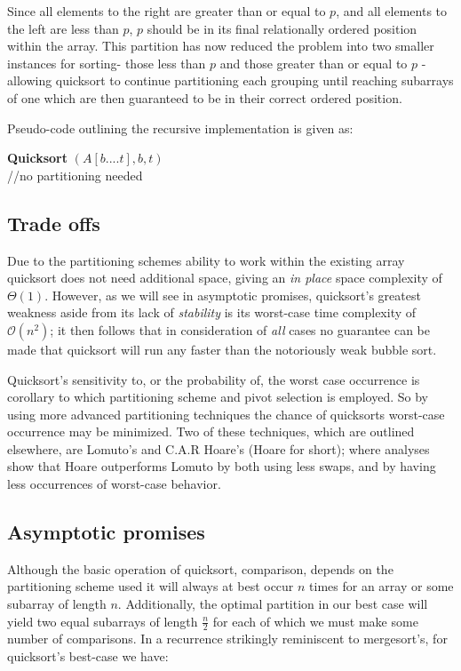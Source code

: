\documentclass[11pt,letterpaper]{report}
\begin{document}
Since all elements to the right are greater than or equal to $p$, and all elements to the left are less than $p$, $p$ should be in its final relationally ordered position within the array. This partition has now reduced the problem into two smaller instances for sorting- those less than $p$ and those greater than or equal to $p$ - allowing quicksort to continue partitioning each grouping until reaching subarrays of one which are then guaranteed to be in their correct ordered position.

Pseudo-code outlining the recursive implementation is given as:\\


\begin{algorithm}[H]
\textbf{Quicksort} $(A[b....t], b, t)$ \\
   {//no partitioning needed}
\end{algorithm}



\subsection*{Trade offs}
Due to the partitioning schemes ability to work within the existing array quicksort does not need additional space, giving an \emph{in place} space complexity of $\Theta(1)$. However, as we will see in asymptotic promises, quicksort's greatest weakness aside from its lack of \emph{stability} is its worst-case time complexity of $\mathcal{O}(n^2)$; it then follows that in consideration of \emph{all} cases no guarantee can be made that quicksort will run any faster than the notoriously weak bubble sort.

Quicksort's sensitivity to, or the probability of, the worst case occurrence is corollary to which partitioning scheme and pivot selection is employed. So by using more advanced partitioning techniques the chance of quicksorts worst-case occurrence may be minimized. Two of these techniques, which are outlined elsewhere, are Lomuto's and C.A.R Hoare's (Hoare for short); where analyses show that Hoare outperforms Lomuto by both using less swaps, and by having less occurrences of worst-case behavior.

\subsection*{Asymptotic promises}
Although the basic operation of quicksort, comparison, depends on the partitioning scheme used it will always at best occur $n$ times for an array or some subarray of length $n$. Additionally, the optimal partition in our best case will yield two equal subarrays of length $\frac{n}{2}$ for each of which we must make some number of comparisons. In a recurrence strikingly reminiscent to mergesort's, for quicksort's best-case we have:
\end{document}
